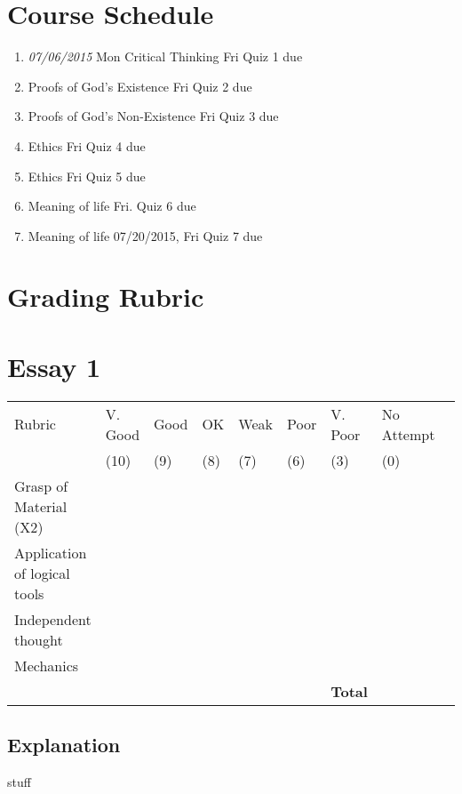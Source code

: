 \documentclass[11pt,article,oneside]{memoir}
\begin{document}
\section{Course Schedule}
\begin{enumerate}
\item \textit{07/06/2015} Mon Critical Thinking Fri Quiz 1 due
\item Proofs of God's Existence Fri Quiz 2 due
\item Proofs of God's Non-Existence Fri Quiz 3 due
\item Ethics Fri Quiz 4 due
\item Ethics Fri Quiz 5 due
\item Meaning of life Fri. Quiz 6 due 
\item Meaning of life 07/20/2015, Fri Quiz 7 due
\end{enumerate}



\newpage
\section{Grading Rubric}

\section*{Essay 1}
\begin{center}


\resizebox{14cm}{!} {
    \begin{tabular}{ | l | l | l | l | l | l | l | l | l |    }
    \hline
    Rubric &  V. Good & Good & OK & Weak & Poor & V. Poor & No Attempt \\  
	 & (10) & (9) & (8) & (7) & (6) & (3)  & (0) \\    \hline
    Grasp of Material (X2) & & & & & & &\\ \hline   
    Application of logical tools &  & & & & & &\\ \hline
	Independent thought &  & & & & & &\\ \hline
 Mechanics & & & & & &  &\\ \hline \hline
 & &  & & &  & \textbf{Total}  & \\ \hline
    \end{tabular}
}


\end{center}


\subsection*{Explanation}

stuff

\end{document}

